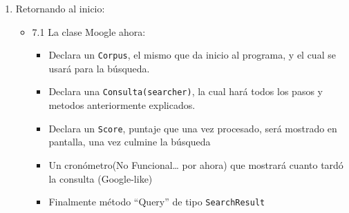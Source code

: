 \begin{enumerate}
\begin{Shaded}
\begin{Highlighting}[]
     \OperatorTok{=}\OperatorTok{;}
     \OperatorTok{=}\OperatorTok{;}
\OperatorTok{\}}

 \OperatorTok{()} \OperatorTok{:} \OperatorTok{(} \OperatorTok{{-}{-}}\OperatorTok{\textless{}}\OperatorTok{\textgreater{}(){-}{-})} \OperatorTok{\{}

\OperatorTok{\}}

 \OperatorTok{\{} \OperatorTok{;}  \OperatorTok{;} \OperatorTok{\}}

\OperatorTok{\textless{}}\OperatorTok{\textgreater{}} \OperatorTok{()} \OperatorTok{\{}
     \OperatorTok{;}
\OperatorTok{\}}

 \OperatorTok{\{}  \OperatorTok{\{}  \OperatorTok{{-}{-}}\OperatorTok{;{-}{-}} \OperatorTok{\}} \OperatorTok{\}}
\OperatorTok{\}}
\end{Highlighting}
\end{Shaded}
\item
  Retornando al inicio:

  \begin{itemize}
  \tightlist
  \item
    7.1 La clase Moogle ahora:

    \begin{itemize}
    \tightlist
    \item
      Declara un \texttt{Corpus}, el mismo que da inicio al programa, y
      el cual se usará para la búsqueda.
    \item
      Declara una \texttt{Consulta(searcher)}, la cual hará todos los
      pasos y metodos anteriormente explicados.
    \item
      Declara un \texttt{Score}, puntaje que una vez procesado, será
      mostrado en pantalla, una vez culmine la búsqueda
    \item
      Un cronómetro(No Funcional\ldots{} por ahora) que mostrará cuanto
      tardó la consulta (Google-like)
    \item
      Finalmente método ``Query'' de tipo \texttt{SearchResult}


\end{itemize}
\end{itemize}
\end{enumerate}
